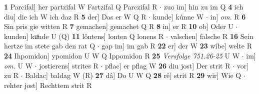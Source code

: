 \documentclass[8pt,a4paper,notitlepage]{article}
\begin{document}
\begin{table}[ht]
\begin{minipage}[t]{0.5\linewidth}
\textbf{1} Parcifal] her partzifal W Fartzifal Q Parczifal R  $\cdot$ zuo im] hin zu im Q \textbf{4} ich diu] die ich W ich daz R \textbf{5} der] Das er W Q R  $\cdot$ kunde] kúnne W  $\cdot$ in] \textit{om.} R \textbf{6} Sin pris gie witten R \textbf{7} gemachen] gemachet Q R \textbf{8} in] er R \textbf{10} ob] Oder U  $\cdot$ kunden] kuͦnde U (Q) \textbf{11} lôntens] lonten Q lonens R  $\cdot$ valschen] falsche R \textbf{16} Sein hertze im stete gab den rat Q  $\cdot$ gap im] im gab R \textbf{22} er] der W \textbf{23} wîbe] welte R \textbf{24} Ihpomidon] ypomidon U W Q Ippomidon R \textbf{25} \textit{Versfolge 751.26-25} U W   $\cdot$ im] \textit{om.} U W  $\cdot$ jostierens] strites R  $\cdot$ pflac] er pflag W \textbf{26} diu jost] Der strit R  $\cdot$ vor] zu R  $\cdot$ Baldac] baldag W (R) \textbf{27} dâ] Do U W Q \textbf{28} rê] strit R \textbf{29} wir] Wie Q  $\cdot$ rehter jost] Rechttem strit R \newline
\end{minipage}
\end{table}
\end{document}
